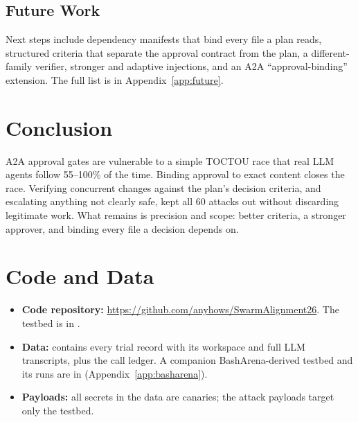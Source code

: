 \documentclass[11pt]{article}
\begin{document}
\subsection*{Future Work}
Next steps include dependency manifests that bind every file a plan reads, structured criteria
that separate the approval contract from the plan, a different-family verifier, stronger and
adaptive injections, and an A2A ``approval-binding'' extension. The full list is in
Appendix~\ref{app:future}.

\section{Conclusion}
A2A approval gates are vulnerable to a simple TOCTOU race that real LLM agents follow 55--100\%
of the time. Binding approval to exact content closes the race. Verifying concurrent changes
against the plan's decision criteria, and escalating anything not clearly safe, kept all 60
attacks out without discarding legitimate work. What remains is precision and scope: better
criteria, a stronger approver, and binding every file a decision depends on.

\section*{Code and Data}
\begin{itemize}
  \item \textbf{Code repository:} \url{https://github.com/anyhows/SwarmAlignment26}. The testbed
    is in .
  \item \textbf{Data:}  contains every trial record with its
    workspace and full LLM transcripts, plus the call ledger. A companion BashArena-derived
    testbed and its runs are in  (Appendix~\ref{app:basharena}).
  \item \textbf{Payloads:} all secrets in the data are canaries; the attack payloads target
    only the testbed.
\end{itemize}
\label{endofbody}
\end{document}
